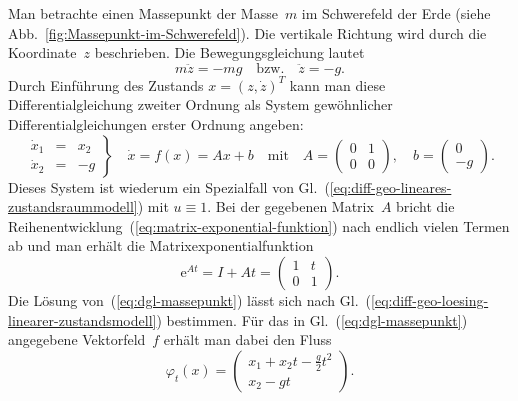 \begin{example}
Man betrachte einen Massepunkt der Masse~$m$ im Schwerefeld der
Erde (siehe Abb.~\ref{fig:Massepunkt-im-Schwerefeld}). Die vertikale
Richtung wird durch die Koordinate~$z$ beschrieben. Die Bewegungsgleichung
lautet
\[
m\ddot{z}=-mg\quad\text{bzw.}\quad\ddot{z}=-g.
\]
Durch Einführung des Zustands $x=(z,\dot{z})^{T}$ kann man diese
Differentialgleichung zweiter Ordnung als System gewöhnlicher Differentialgleichungen
erster Ordnung angeben:
\begin{equation}
\left.\begin{array}{lcc}
\dot{x}_{1} & = & x_{2}\\
\dot{x}_{2} & = & -g
\end{array}\right\} \quad\dot{x}=f(x)=Ax+b\quad\text{mit}\quad A=\left(\begin{array}{cc}
0 & 1\\
0 & 0
\end{array}\right),\quad b=\left(\begin{array}{r}
0\\
-g
\end{array}\right).\label{eq:dgl-massepunkt}
\end{equation}
Dieses System ist wiederum ein Spezialfall von Gl.~(\ref{eq:diff-geo-lineares-zustandsraummodell})
mit $u\equiv1$. Bei der gegebenen Matrix~$A$ bricht die Reihenentwicklung~(\ref{eq:matrix-exponential-funktion})
nach endlich vielen Termen ab und man erhält die Matrixexponentialfunktion
\[
{\mathrm{e}}^{At}=I+At=\left(\begin{array}{cc}
1 & t\\
0 & 1
\end{array}\right).
\]
Die Lösung von~(\ref{eq:dgl-massepunkt}) lässt sich nach Gl.~(\ref{eq:diff-geo-loesing-linearer-zustandsmodell})
bestimmen. Für das in Gl.~(\ref{eq:dgl-massepunkt}) angegebene Vektorfeld~$f$
erhält man dabei den Fluss
\[
\varphi_{t}(x)=\left(\begin{array}{c}
x_{1}+x_{2}t-\frac{g}{2}t^{2}\\
x_{2}-gt
\end{array}\right).
\]
\end{example}


\medskip{}

